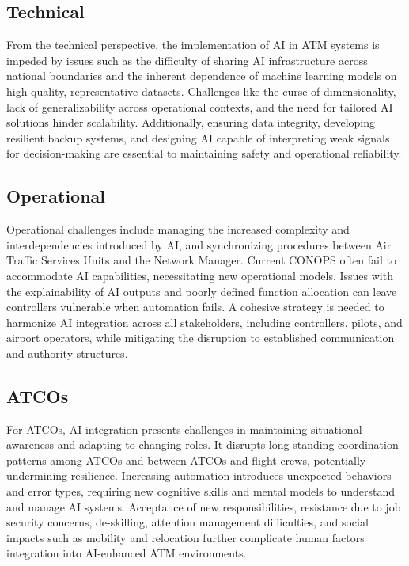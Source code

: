 \subsection{Technical}

From the technical perspective, the implementation of \gls{AI} in \gls{ATM} systems is impeded by issues such as the difficulty of sharing \gls{AI} infrastructure across national boundaries and the inherent dependence of machine learning models on high-quality, representative datasets. 
Challenges like the curse of dimensionality, lack of generalizability across operational contexts, and the need for tailored \gls{AI} solutions hinder scalability. 
Additionally, ensuring data integrity, developing resilient backup systems, and designing \gls{AI} capable of interpreting weak signals for decision-making are essential to maintaining safety and operational reliability.

\subsection{Operational}

Operational challenges include managing the increased complexity and interdependencies introduced by \gls{AI}, and synchronizing procedures between Air Traffic Services Units and the Network Manager. 
Current \gls{CONOPS} often fail to accommodate \gls{AI} capabilities, necessitating new operational models. 
Issues with the explainability of AI outputs and poorly defined function allocation can leave controllers vulnerable when automation fails. 
A cohesive strategy is needed to harmonize AI integration across all stakeholders, including controllers, pilots, and airport operators, while mitigating the disruption to established communication and authority structures.

\subsection{ATCOs}

For \glspl{ATCO}, \gls{AI} integration presents challenges in maintaining situational awareness and adapting to changing roles. 
It disrupts long-standing coordination patterns among \glspl{ATCO} and between \glspl{ATCO} and flight crews, potentially undermining resilience. 
Increasing automation introduces unexpected behaviors and error types, requiring new cognitive skills and mental models to understand and manage \gls{AI} systems. 
Acceptance of new responsibilities, resistance due to job security concerns, de-skilling, attention management difficulties, and social impacts such as mobility and relocation further complicate human factors integration into \gls{AI}-enhanced \gls{ATM} environments.